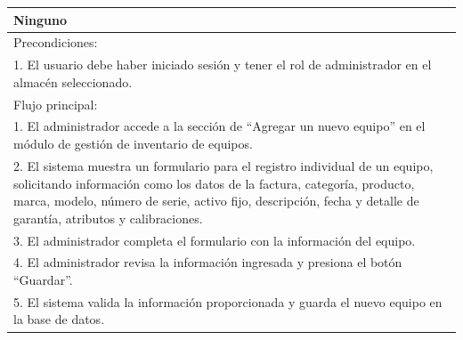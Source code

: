 \documentclass[stu, 12pt, letterpaper, donotrepeattitle, floatsintext, natbib]{apa7}
\begin{document}
\begin{longtable}{@{} p{16.5cm} @{}}
    Ninguno                                                                                                                                                                                                                                                                    \\ \midrule
    Precondiciones:                                                                                                                                                                                                                                                            \\
    1. El usuario debe haber iniciado sesión y tener el rol de administrador en el almacén seleccionado.                                                                                                                                                                       \\ \midrule
    Flujo principal:                                                                                                                                                                                                                                                           \\
    1. El administrador accede a la sección de ``Agregar un nuevo equipo'' en el módulo de gestión de inventario de equipos.                                                                                                                                                   \\
    2. El sistema muestra un formulario para el registro individual de un equipo, solicitando información como los datos de la factura, categoría, producto, marca, modelo, número de serie, activo fijo, descripción, fecha y detalle de garantía, atributos y calibraciones. \\
    3. El administrador completa el formulario con la información del equipo.                                                                                                                                                                                                  \\
    4. El administrador revisa la información ingresada y presiona el botón ``Guardar''.                                                                                                                                                                                       \\
    5. El sistema valida la información proporcionada y guarda el nuevo equipo en la base de datos.                                                                                                                                                                            \\

\end{longtable}
\end{document}
